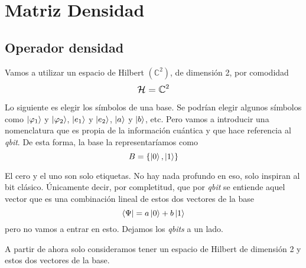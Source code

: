 %
%

\chapter{Matriz Densidad}

\section{Operador densidad}
Vamos a utilizar un espacio de Hilbert $\left(\mathbb{C}^2\right)$, de
dimensión 2, por comodidad
\[
  \mathlarger{\mathcal{H} = \mathbb{C}^2}
\]

Lo siguiente es elegir los símbolos de una base. Se podrían elegir algunos
símbolos como $\ket{\varphi_1}$ y $\ket{\varphi_2}$, $\ket{e_1}$ y $\ket{e_2}$,
$\ket{a}$ y $\ket{b}$, etc. Pero vamos a introducir una nomenclatura que es
propia de la información cuántica y que hace referencia al \emph{qbit}.
De esta forma, la base\footnotemark{} la representaríamos como
\[
  B = \{\ket{0}, \ket{1}\}
\]

El cero y el uno son solo etiquetas. No hay nada profundo en eso, solo inspiran
al bit clásico. Únicamente decir, por completitud, que por \emph{qbit} se
entiende aquel vector que es una combinación lineal de estos dos vectores de la
base
\[
  \bra{\Psi} = a \ket{0} + b \ket{1}
\]
pero no vamos a entrar en esto. Dejamos los \emph{qbits} a un lado.

A partir de ahora solo consideramos tener un espacio de Hilbert de dimensión 2
y estos dos vectores de la base.






